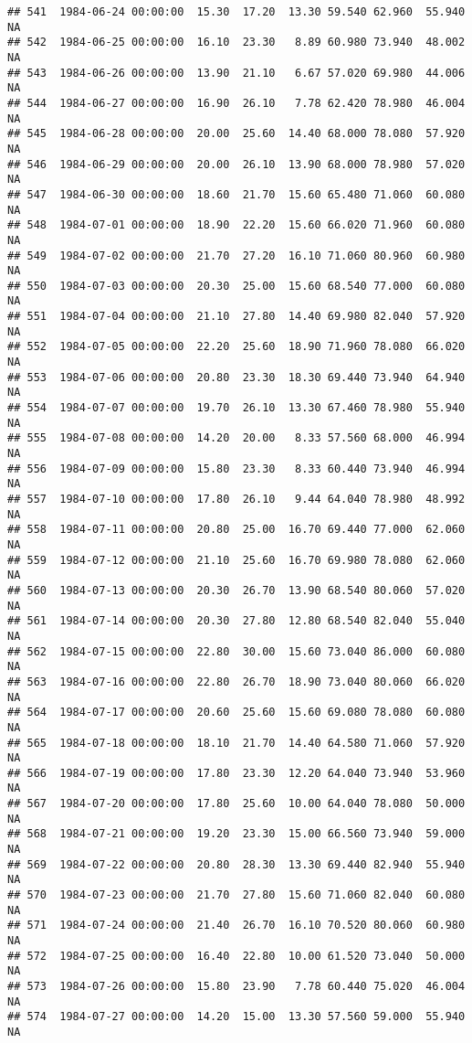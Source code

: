 \documentclass{article}\usepackage{graphicx, color}
\makeatletter
\newenvironment{kframe}{%
 \def\at@end@of@kframe{}%
 \ifinner\ifhmode%
  \def\at@end@of@kframe{\end{minipage}}%
  \begin{minipage}{\columnwidth}%
 \fi\fi%
 \def\FrameCommand##1{\hskip\@totalleftmargin \hskip-\fboxsep
 \colorbox{shadecolor}{##1}\hskip-\fboxsep
     \hskip-\linewidth \hskip-\@totalleftmargin \hskip\columnwidth}%
 \MakeFramed {\advance\hsize-\width
   \@totalleftmargin\z@ \linewidth\hsize
   \@setminipage}}%
 {\par\unskip\endMakeFramed%
 \at@end@of@kframe}
\newenvironment{knitrout}{}{} %
\makeatother
\begin{document}
\begin{knitrout}
\begin{kframe}
\begin{verbatim}
## 541  1984-06-24 00:00:00  15.30  17.20  13.30 59.540 62.960  55.940     NA
## 542  1984-06-25 00:00:00  16.10  23.30   8.89 60.980 73.940  48.002     NA
## 543  1984-06-26 00:00:00  13.90  21.10   6.67 57.020 69.980  44.006     NA
## 544  1984-06-27 00:00:00  16.90  26.10   7.78 62.420 78.980  46.004     NA
## 545  1984-06-28 00:00:00  20.00  25.60  14.40 68.000 78.080  57.920     NA
## 546  1984-06-29 00:00:00  20.00  26.10  13.90 68.000 78.980  57.020     NA
## 547  1984-06-30 00:00:00  18.60  21.70  15.60 65.480 71.060  60.080     NA
## 548  1984-07-01 00:00:00  18.90  22.20  15.60 66.020 71.960  60.080     NA
## 549  1984-07-02 00:00:00  21.70  27.20  16.10 71.060 80.960  60.980     NA
## 550  1984-07-03 00:00:00  20.30  25.00  15.60 68.540 77.000  60.080     NA
## 551  1984-07-04 00:00:00  21.10  27.80  14.40 69.980 82.040  57.920     NA
## 552  1984-07-05 00:00:00  22.20  25.60  18.90 71.960 78.080  66.020     NA
## 553  1984-07-06 00:00:00  20.80  23.30  18.30 69.440 73.940  64.940     NA
## 554  1984-07-07 00:00:00  19.70  26.10  13.30 67.460 78.980  55.940     NA
## 555  1984-07-08 00:00:00  14.20  20.00   8.33 57.560 68.000  46.994     NA
## 556  1984-07-09 00:00:00  15.80  23.30   8.33 60.440 73.940  46.994     NA
## 557  1984-07-10 00:00:00  17.80  26.10   9.44 64.040 78.980  48.992     NA
## 558  1984-07-11 00:00:00  20.80  25.00  16.70 69.440 77.000  62.060     NA
## 559  1984-07-12 00:00:00  21.10  25.60  16.70 69.980 78.080  62.060     NA
## 560  1984-07-13 00:00:00  20.30  26.70  13.90 68.540 80.060  57.020     NA
## 561  1984-07-14 00:00:00  20.30  27.80  12.80 68.540 82.040  55.040     NA
## 562  1984-07-15 00:00:00  22.80  30.00  15.60 73.040 86.000  60.080     NA
## 563  1984-07-16 00:00:00  22.80  26.70  18.90 73.040 80.060  66.020     NA
## 564  1984-07-17 00:00:00  20.60  25.60  15.60 69.080 78.080  60.080     NA
## 565  1984-07-18 00:00:00  18.10  21.70  14.40 64.580 71.060  57.920     NA
## 566  1984-07-19 00:00:00  17.80  23.30  12.20 64.040 73.940  53.960     NA
## 567  1984-07-20 00:00:00  17.80  25.60  10.00 64.040 78.080  50.000     NA
## 568  1984-07-21 00:00:00  19.20  23.30  15.00 66.560 73.940  59.000     NA
## 569  1984-07-22 00:00:00  20.80  28.30  13.30 69.440 82.940  55.940     NA
## 570  1984-07-23 00:00:00  21.70  27.80  15.60 71.060 82.040  60.080     NA
## 571  1984-07-24 00:00:00  21.40  26.70  16.10 70.520 80.060  60.980     NA
## 572  1984-07-25 00:00:00  16.40  22.80  10.00 61.520 73.040  50.000     NA
## 573  1984-07-26 00:00:00  15.80  23.90   7.78 60.440 75.020  46.004     NA
## 574  1984-07-27 00:00:00  14.20  15.00  13.30 57.560 59.000  55.940     NA

\end{verbatim}
\end{kframe}
\end{knitrout}
\end{document}
